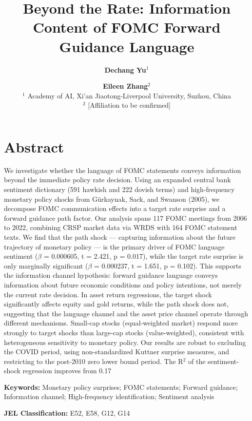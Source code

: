 \documentclass[12pt]{article}
\title{\textbf{Beyond the Rate: Information Content of FOMC Forward Guidance Language}}
\author{
\textbf{Dechang Yu}$^{1}$ \and \textbf{Eileen Zhang}$^{2}$ \\[6pt]
\small $^{1}$ Academy of AI, Xi'an Jiaotong-Liverpool University, Suzhou, China \\
\small $^{2}$ [Affiliation to be confirmed]
}
\date{}
\begin{document}
\maketitle


\section{Abstract}

We investigate whether the language of FOMC statements conveys information beyond the immediate policy rate decision. Using an expanded central bank sentiment dictionary (591 hawkish and 222 dovish terms) and high-frequency monetary policy shocks from Gürkaynak, Sack, and Swanson (2005), we decompose FOMC communication effects into a target rate surprise and a forward guidance path factor. Our analysis spans 117 FOMC meetings from 2006 to 2022, combining CRSP market data via WRDS with 164 FOMC statement texts. We find that the path shock --- capturing information about the future trajectory of monetary policy --- is the primary driver of FOMC language sentiment ($\beta$ = 0.000605, t = 2.421, p = 0.017), while the target rate surprise is only marginally significant ($\beta$ = 0.000237, t = 1.651, p = 0.102). This supports the information channel hypothesis: forward guidance language conveys information about future economic conditions and policy intentions, not merely the current rate decision. In asset return regressions, the target shock significantly affects equity and gold returns, while the path shock does not, suggesting that the language channel and the asset price channel operate through different mechanisms. Small-cap stocks (equal-weighted market) respond more strongly to target shocks than large-cap stocks (value-weighted), consistent with heterogeneous sensitivity to monetary policy. Our results are robust to excluding the COVID period, using non-standardized Kuttner surprise measures, and restricting to the post-2010 zero lower bound period. The R$^2$ of the sentiment-shock regression improves from 0.17%

\textbf{Keywords:} Monetary policy surprises; FOMC statements; Forward guidance; Information channel; High-frequency identification; Sentiment analysis

\textbf{JEL Classification:} E52, E58, G12, G14
\end{document}
